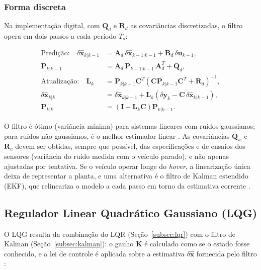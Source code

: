 \subsubsection{Forma discreta}

Na implementação digital, com $\mathbf{Q}_d$ e $\mathbf{R}_d$ as covariâncias discretizadas, o filtro opera em dois passos a cada período $T_s$:

\begin{align}
\text{Predição:}\quad
\delta\hat{\mathbf{x}}_{k|k-1} &= \mathbf{A}_d\,\delta\hat{\mathbf{x}}_{k-1|k-1}+\mathbf{B}_d\,\delta\mathbf{u}_{k-1}, \label{eq:kf_pred_x}\\
\mathbf{P}_{k|k-1} &= \mathbf{A}_d\,\mathbf{P}_{k-1|k-1}\,\mathbf{A}_d^{T}+\mathbf{Q}_d, \label{eq:kf_pred_P}\\[4pt]
\text{Atualização:}\quad
\mathbf{L}_k &= \mathbf{P}_{k|k-1}\mathbf{C}^{T}\left(\mathbf{C}\mathbf{P}_{k|k-1}\mathbf{C}^{T}+\mathbf{R}_d\right)^{-1}, \label{eq:kf_ganho}\\
\delta\hat{\mathbf{x}}_{k|k} &= \delta\hat{\mathbf{x}}_{k|k-1}+\mathbf{L}_k\left(\delta\mathbf{y}_k-\mathbf{C}\,\delta\hat{\mathbf{x}}_{k|k-1}\right), \label{eq:kf_upd_x}\\
\mathbf{P}_{k|k} &= \left(\mathbf{I}-\mathbf{L}_k\mathbf{C}\right)\mathbf{P}_{k|k-1}. \label{eq:kf_upd_P}
\end{align}

\noindent O filtro é ótimo (variância mínima) para sistemas lineares com ruídos gaussianos; para ruídos não gaussianos, é o melhor estimador linear \cite{simon2006,welch2006}. As covariâncias $\mathbf{Q}_w$ e $\mathbf{R}_v$ devem ser obtidas, sempre que possível, das especificações e de ensaios dos sensores (variância do ruído medida com o veículo parado), e não apenas ajustadas por tentativa. Se o veículo operar longe do \textit{hover}, a linearização única deixa de representar a planta, e uma alternativa é o filtro de Kalman estendido (EKF), que relineariza o modelo a cada passo em torno da estimativa corrente \cite{simon2006,welch2006}.

\subsection{Regulador Linear Quadrático Gaussiano (LQG)}\label{subsec:lqg}

O LQG resulta da combinação do LQR (Seção~\ref{subsec:lqr}) com o filtro de Kalman (Seção~\ref{subsec:kalman}): o ganho $\mathbf{K}$ é calculado como se o estado fosse conhecido, e a lei de controle é aplicada sobre a estimativa $\delta\hat{\mathbf{x}}$ fornecida pelo filtro \cite{athans1971,anderson1990}:

